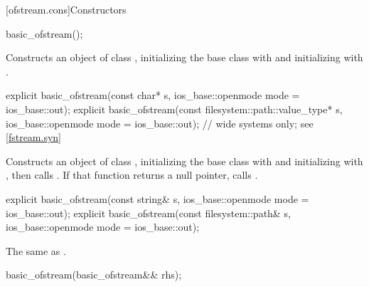 [ofstream.cons]{Constructors}

%
\begin{itemdecl}
basic_ofstream();
\end{itemdecl}

\begin{itemdescr}
\pnum
\effects
Constructs an object of class
,
initializing the base class with
and initializing  with
.
\end{itemdescr}

%
\begin{itemdecl}
explicit basic_ofstream(const char* s,
                        ios_base::openmode mode = ios_base::out);
explicit basic_ofstream(const filesystem::path::value_type* s,
                        ios_base::openmode mode = ios_base::out); // wide systems only; see \ref{fstream.syn}
\end{itemdecl}

\begin{itemdescr}
\pnum
\effects
Constructs an object of class
,
initializing the base class with
and initializing  with
,
then calls
.
If that function returns a null pointer, calls
.
\end{itemdescr}

%
\begin{itemdecl}
explicit basic_ofstream(const string& s,
                        ios_base::openmode mode = ios_base::out);
explicit basic_ofstream(const filesystem::path& s,
                        ios_base::openmode mode = ios_base::out);
\end{itemdecl}

\begin{itemdescr}
\pnum
\effects The same as .
\end{itemdescr}

%
\begin{itemdecl}
basic_ofstream(basic_ofstream&& rhs);
\end{itemdecl}

